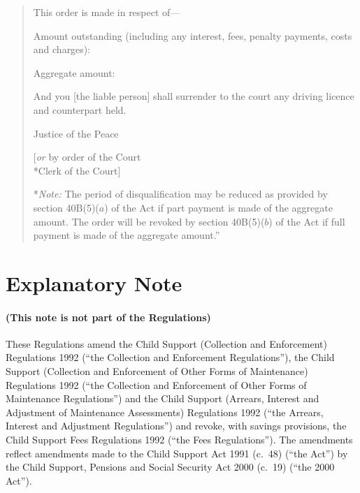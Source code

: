 \documentclass[12pt,a4paper]{article}
\begin{document}
\begin{quotation}
\medskip

This order is made in respect of---

Amount outstanding (including any interest, fees, penalty payments, costs and charges):

\medskip

Aggregate amount:

\medskip

And you [the liable person] shall surrender to the court any driving licence and counterpart held.

\medskip

{\raggedleft Justice of the Peace

\medskip

[\emph{or} by order of the Court\\*Clerk of the Court]

}

\medskip

*\emph{Note:} The period of disqualification may be reduced as provided by section 40B(5)($a$) of the Act if part payment is made of the aggregate amount.  The order will be revoked by section 40B(5)($b$) of the Act if full payment is made of the aggregate amount.''

\end{quotation}

\part{Explanatory Note}

\renewcommand\parthead{— Explanatory Note}

\subsection*{(This note is not part of the Regulations)}

These Regulations amend the Child Support (Collection and Enforcement) Regulations 1992 (“the Collection and Enforcement Regulations”), the Child Support (Collection and Enforcement of Other Forms of Maintenance) Regulations 1992 (“the Collection and Enforcement of Other Forms of Maintenance Regulations”) and the Child Support (Arrears, Interest and Adjustment of Maintenance Assessments) Regulations 1992 (“the Arrears, Interest and Adjustment Regulations”) and revoke, with savings provisions, the Child Support Fees Regulations 1992 (“the Fees Regulations”). The amendments reflect amendments made to the Child Support Act 1991 (c.\ 48) (“the Act”) by the Child Support, Pensions and Social Security Act 2000 (c.\ 19) (“the 2000 Act”).
\end{document}
